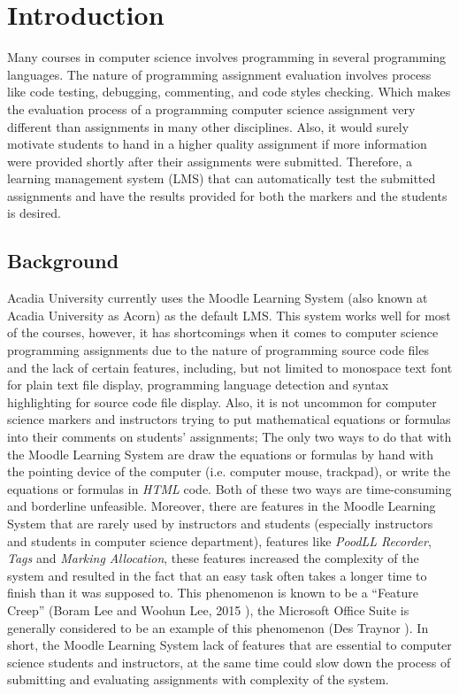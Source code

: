 

\chapter{Introduction}
\label{chap:INTRO}

Many courses in computer science involves programming in several programming
languages.
The nature of programming assignment evaluation
involves process like code testing, debugging, commenting, and code styles
checking.
Which makes the evaluation process of a programming computer science assignment
very different than assignments in many other disciplines.
Also, it would surely motivate students to hand in a higher quality assignment
if more information were provided shortly after their assignments were
submitted.
Therefore, a learning management system (LMS) that can automatically test the
submitted assignments and have the results provided for both the markers and
the students is desired.

\section{Background}

Acadia University currently uses the Moodle Learning System (also known at 
Acadia University as Acorn) as the default LMS.
This system works well for most of the courses, however, it has shortcomings
when it comes to computer science programming assignments due to
the nature of programming source code files and the lack of certain
features, including, but not limited to monospace text font for plain text
file display, programming language detection and syntax
highlighting for source code file display.
Also, it is not uncommon for computer science markers and instructors
trying to put mathematical equations or formulas into their comments on
students' assignments; The only two ways to do that with the Moodle
Learning System are draw the equations or formulas by hand with the
pointing device of the computer (i.e. computer mouse, trackpad), or write
the equations or formulas in \emph{HTML} code. Both of these two ways are
time-consuming and borderline unfeasible.
Moreover, there are features in the Moodle Learning System that are rarely
used by instructors and students (especially instructors and students in
computer science department), features like \emph{PoodLL Recorder},
\emph{Tags} and \emph{Marking Allocation},
these features increased the
complexity of the system and resulted in the fact that an easy task 
often takes a longer time to finish than it was supposed to. This phenomenon
is known to be a ``Feature Creep''  (Boram Lee and Woohun Lee, 2015 
\cite{featureCreep}), the Microsoft Office Suite is generally
considered to be an example of this phenomenon (Des Traynor 
\cite{msFeatureCreep}).
In short, the Moodle Learning System lack of features that are essential
to computer science students and instructors, at the same time could slow
down the process of submitting and evaluating assignments with complexity of
the system.

